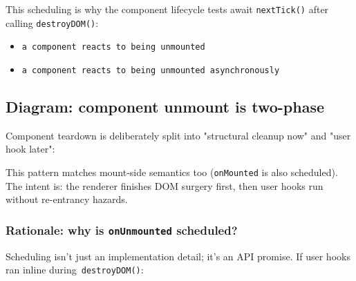This scheduling is why the component lifecycle tests await \texttt{nextTick()} after calling \texttt{destroyDOM()}:

\begin{itemize}
  \item \texttt{a component reacts to being unmounted}
  \item \texttt{a component reacts to being unmounted asynchronously}
\end{itemize}

\subsection*{Diagram: component unmount is two-phase}
Component teardown is deliberately split into "structural cleanup now" and "user hook later":

\begin{center}
\end{center}

This pattern matches mount-side semantics too (\texttt{onMounted} is also scheduled). The intent is: the renderer finishes DOM surgery first, then user hooks run without re-entrancy hazards.

\subsubsection{Rationale: why is \texttt{onUnmounted} scheduled?}

Scheduling isn't just an implementation detail; it's an API promise.
If user hooks ran inline during\ \texttt{destroyDOM()}:

